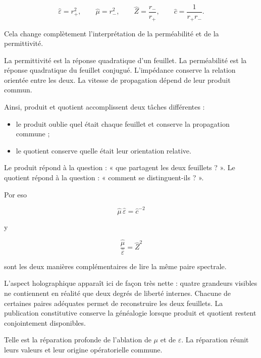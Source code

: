 \[
\widehat\varepsilon=r_+^2,
\qquad
\widehat\mu=r_-^2,
\qquad
\widehat Z=\frac{r_-}{r_+},
\qquad
\widehat c=\frac1{r_+r_-}.
\]

Cela change complètement l’interprétation de la perméabilité et de la permittivité.\par

La permittivité est la réponse quadratique d’un feuillet. La perméabilité est la réponse quadratique du feuillet conjugué. L’impédance conserve la relation orientée entre les deux. La vitesse de propagation dépend de leur produit commun.\par

Ainsi, produit et quotient accomplissent deux tâches différentes :\par

\begin{itemize}[leftmargin=*,itemsep=0.35em]
\item le produit oublie quel était chaque feuillet et conserve la propagation commune ;
\item le quotient conserve quelle était leur orientation relative.
\end{itemize}

Le produit répond à la question : « que partagent les deux feuillets ? ». Le quotient répond à la question : « comment se distinguent-ils ? ».\par

Por eso\par

\[
\widehat\mu\,\widehat\varepsilon=\widehat c^{-2}
\]

y\par

\[
\frac{\widehat\mu}{\widehat\varepsilon}
=
\widehat Z^2
\]

sont les deux manières complémentaires de lire la même paire spectrale.\par

L’aspect holographique apparaît ici de façon très nette : quatre grandeurs visibles ne contiennent en réalité que deux degrés de liberté internes. Chacune de certaines paires adéquates permet de reconstruire les deux feuillets. La publication constitutive conserve la généalogie lorsque produit et quotient restent conjointement disponibles.\par

Telle est la réparation profonde de l’ablation de \(\mu\) et de \(\varepsilon\). La réparation réunit leurs valeurs et leur origine opératorielle commune.\par

